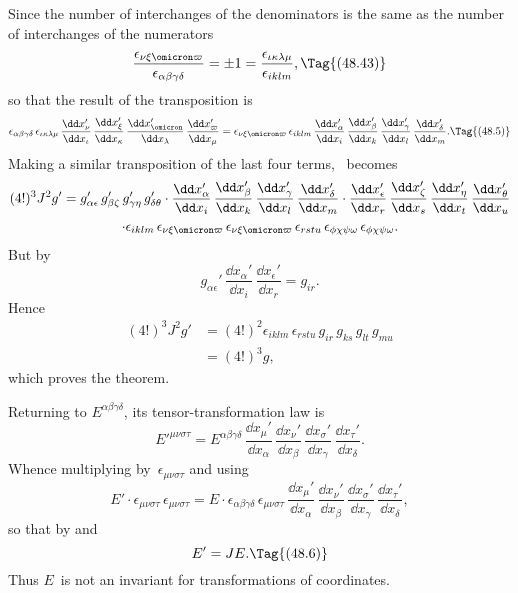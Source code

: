 \documentclass[12pt]{book}
\begin{document}
Since the number of interchanges of the denominators is the same as the
number of interchanges of the numerators
\[
\frac{\epsilon_{\nu\xi\omicron\varpi}}{\epsilon_{\alpha\beta\gamma\delta}}
= \pm1 = \frac{\epsilon_{\iota\kappa\lambda\mu}}{\epsilon_{iklm}},
\Tag{(48.43)}
\]
so that the result of the transposition is
\[
  \epsilon_{\alpha\beta\gamma\delta}\, \epsilon_{\iota\kappa\lambda\mu}\,
  \frac{\dd x_{\nu}'}{\dd x_{\iota}}\,
  \frac{\dd x_{\xi}'}{\dd x_{\kappa}}\,
  \frac{\dd x_{\omicron}'}{\dd x_{\lambda}}\,
  \frac{\dd x_{\varpi}'}{\dd x_{\mu}}
  = \epsilon_{\nu\xi\omicron\varpi}\, \epsilon_{iklm}\,
  \frac{\dd x_{\alpha}'}{\dd x_{i}}\,
  \frac{\dd x_{\beta}'}{\dd x_{k}}\,
  \frac{\dd x_{\gamma}'}{\dd x_{l}}\,
  \frac{\dd x_{\delta}'}{\dd x_{m}}.
  \Tag{(48.5)}
\]
Making a similar transposition of the last four terms, ~becomes
\begin{multline*}
  (4!)^{3} J^{2} g'
  = g_{\alpha\epsilon}'\, g_{\beta\zeta}'\, g_{\gamma\eta}'\, g_{\delta\theta}'
  \cdot \frac{\dd x_{\alpha}'}{\dd x_{i}}\,
  \frac{\dd x_{\beta}'}{\dd x_{k}}\,
  \frac{\dd x_{\gamma}'}{\dd x_{l}}\,
  \frac{\dd x_{\delta}'}{\dd x_{m}}
  \cdot \frac{\dd x_{\epsilon}'}{\dd x_{r}}\,
  \frac{\dd x_{\zeta}'}{\dd x_{s}}\,
  \frac{\dd x_{\eta}'}{\dd x_{t}}\,
  \frac{\dd x_{\theta}'}{\dd x_{u}} \\
  \cdot \epsilon_{iklm}\, \epsilon_{\nu\xi\omicron\varpi}\, \epsilon_{\nu\xi\omicron\varpi}\,
  \epsilon_{rstu}\, \epsilon_{\phi\chi\psi\omega}\, \epsilon_{\phi\chi\psi\omega}.
\end{multline*}
But by~
\[
g_{\alpha\epsilon}'\, \frac{\dd x_{\alpha}'}{\dd x_{i}}\, \frac{\dd x_{\epsilon}'}{\dd x_{r}}
= g_{ir}.
\]
Hence
\begin{align*}
  (4!)^{3} J^{2} g'
  &= (4!)^{2} \epsilon_{iklm}\, \epsilon_{rstu}\, g_{ir}\, g_{ks}\, g_{lt}\, g_{mu} \\
  &= (4!)^{3} g,
\end{align*}
which proves the theorem.

Returning to $E^{\alpha\beta\gamma\delta}$, its tensor-transformation law is
\[
E'^{\mu\nu\sigma\tau} = E^{\alpha\beta\gamma\delta}\,
\frac{\dd x_{\mu}'}{\dd x_{\alpha}}\,
\frac{\dd x_{\nu}'}{\dd x_{\beta}}\,
\frac{\dd x_{\sigma}'}{\dd x_{\gamma}}\,
\frac{\dd x_{\tau}'}{\dd x_{\delta}}.
\]
Whence multiplying by~$\epsilon_{\mu\nu\sigma\tau}$ and using~
\[
E' \cdot \epsilon_{\mu\nu\sigma\tau}\, \epsilon_{\mu\nu\sigma\tau}
= E \cdot \epsilon_{\alpha\beta\gamma\delta}\, \epsilon_{\mu\nu\sigma\tau}\,
\frac{\dd x_{\mu}'}{\dd x_{\alpha}}\,
\frac{\dd x_{\nu}'}{\dd x_{\beta}}\,
\frac{\dd x_{\sigma}'}{\dd x_{\gamma}}\,
\frac{\dd x_{\tau}'}{\dd x_{\delta}},
\]
so that by  and~
\[
E' = JE.
\Tag{(48.6)}
\]
Thus $E$~is not an invariant for transformations of coordinates.
\end{document}

